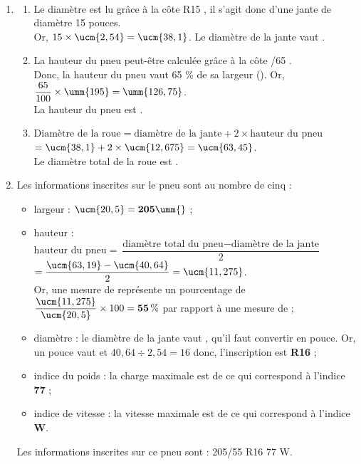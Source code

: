 {\begin{corrige}
\ \\ [-5mm]
   \begin{enumerate}
      \item 
         \begin{enumerate}
            \item Le diamètre est lu grâce à la côte \og R15 \fg, il s'agit donc d'une jante de diamètre 15 pouces. \\
               Or, $15\times\ucm{2,54} =\ucm{38,1}$. {\blue Le diamètre de la jante vaut }. \\
            \item La hauteur du pneu peut-être calculée grâce à la côte /65 \fg. \\
               Donc, la hauteur du pneu vaut 65 \% de sa largeur (). Or, $\dfrac{65}{100}\times\umm{195} =\umm{126,75}$. \\
               {\blue La hauteur du pneu est }. \\
            \item $\text{Diamètre de la roue} = \text{diamètre de la jante} + 2\times\text{hauteur du pneu}$ \\
               \hspace*{3.38cm} $=\ucm{38,1}+2\times\ucm{12,675}=\ucm{63,45}$. \\
               {\blue Le diamètre total de la roue est }. \\
         \end{enumerate}
      \setcounter{enumi}{1}
      \item Les informations inscrites sur le pneu sont au nombre de cinq :
         \begin{itemize}
            \item largeur : $\ucm{20,5} = {\bf 205} \umm{}$ ;
            \item hauteur : $\text{hauteur du pneu} = \dfrac{\text{diamètre total du pneu}-\text{diamètre de la jante}}{2}$ \\ [1mm]
               \hspace*{4.7cm} $=\dfrac{\ucm{63,19}-\ucm{40,64}}{2} =\ucm{11,275}$. \\ [1mm]
               Or, une mesure de  représente un pourcentage de $\dfrac{\ucm{11,275}}{\ucm{20,5}}\times100 =\bf{55}\,\%$ par rapport à une mesure de  ;
            \item diamètre : le diamètre de la jante vaut , qu'il faut convertir en pouce. Or, un pouce vaut  et $40,64\div2,54=16$ donc, l'inscription est {\bf R16} ;
            \item indice du poids : la charge maximale est de  ce qui correspond à l'indice {\bf 77} ;
            \item indice de vitesse : la vitesse maximale est de  ce qui correspond à l'indice {\bf W}. \\
         \end{itemize}
         {\blue Les informations inscrites sur ce pneu sont : 205/55 R16 77 W}.
   \end{enumerate}
\end{corrige}

}
